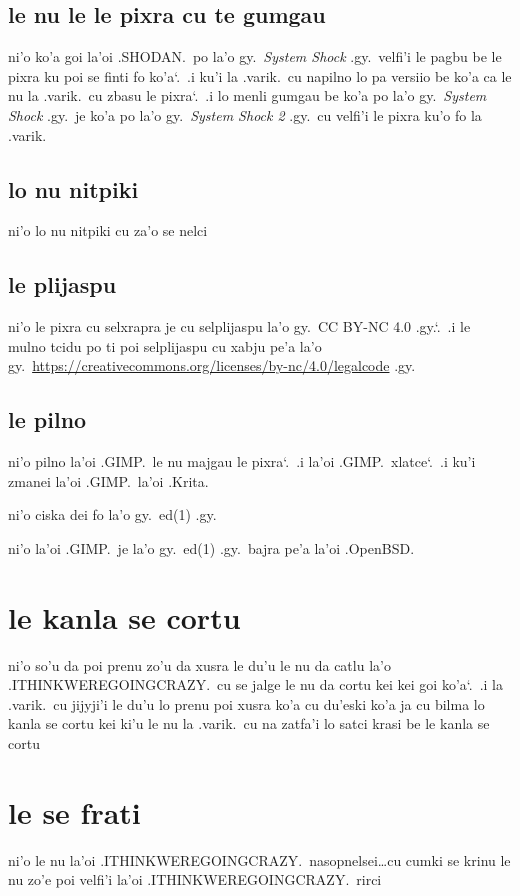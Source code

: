 \documentclass{report}
\newcommand\sds{\spacefactor\sfcode`.\ \space}
\begin{document}
\subsection{le nu le le pixra cu te gumgau}
ni'o ko'a goi la'oi .SHODAN.\ po la'o gy.\ \textit{System Shock} .gy.\ velfi'i le pagbu be le pixra ku poi se finti fo ko'a\sds  .i ku'i la .varik.\ cu napilno lo pa versiio be ko'a ca le nu la .varik.\ cu zbasu le pixra\sds  .i lo menli gumgau be ko'a po la'o gy.\ \textit{System Shock} .gy.\ je ko'a po la'o gy.\ \textit{System Shock 2} .gy.\ cu velfi'i le pixra ku'o fo la .varik.
\subsection{lo nu nitpiki}
ni'o lo nu nitpiki cu za'o se nelci

\subsection{le plijaspu}
ni'o le pixra cu selxrapra je cu selplijaspu la'o gy.\ CC BY-NC 4.0 .gy.\sds  .i le mulno tcidu po ti poi selplijaspu cu xabju pe'a la'o gy.\ \url{https://creativecommons.org/licenses/by-nc/4.0/legalcode} .gy.

\subsection{le pilno}
ni'o pilno la'oi .GIMP.\ le nu majgau le pixra\sds  .i  la'oi .GIMP.\ xlatce\sds  .i ku'i zmanei la'oi .GIMP.\ la'oi .Krita.

ni'o ciska dei fo la'o gy.\ ed(1) .gy.

ni'o la'oi .GIMP.\ je la'o gy.\ ed(1) .gy.\ bajra pe'a la'oi .OpenBSD.

\section{le kanla se cortu}
ni'o so'u da poi prenu zo'u da xusra le du'u le nu da catlu la'o .ITHINKWEREGOINGCRAZY.\ cu se jalge le nu da cortu kei kei goi ko'a\sds  .i la .varik.\ cu jijyji'i le du'u lo prenu poi xusra ko'a cu du'eski ko'a ja cu bilma lo kanla se cortu kei ki'u le nu la .varik.\ cu na zatfa'i lo satci krasi be le kanla se cortu

\section{le se frati}
ni'o le nu la'oi .ITHINKWEREGOINGCRAZY.\ nasopnelsei\ldots cu cumki se krinu le nu zo'e poi velfi'i la'oi .ITHINKWEREGOINGCRAZY.\ rirci
\end{document}
